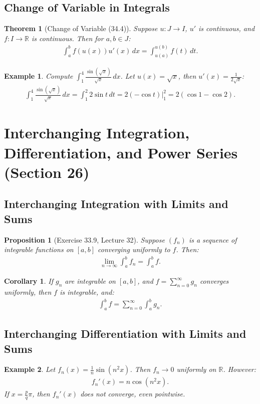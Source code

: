 \documentclass[9pt]{article}
\theoremstyle{definition}
\theoremstyle{plain}
\newtheorem{theorem}{Theorem}
\newtheorem{proposition}{Proposition}
\newtheorem{example}{Example}
\newtheorem{corollary}{Corollary}
\begin{document}
\subsection*{Change of Variable in Integrals}
\begin{theorem}[Change of Variable (34.4)]
Suppose $ u : J \to I $, $ u' $ is continuous, and $ f : I \to \mathbb{R} $ is continuous. Then for $ a, b \in J $:
\begin{align}
\int_a^b f(u(x)) u'(x) \, dx = \int_{u(a)}^{u(b)} f(t) \, dt.
\end{align}
\end{theorem}

\begin{example}
Compute $ \int_1^4 \frac{\sin(\sqrt{x})}{\sqrt{x}} \, dx $. Let $ u(x) = \sqrt{x} $, then $ u'(x) = \frac{1}{2\sqrt{x}} $:
\begin{align}
\int_1^4 \frac{\sin(\sqrt{x})}{\sqrt{x}} \, dx = \int_1^2 2 \sin t \, dt = 2(-\cos t) \big|_1^2 = 2(\cos 1 - \cos 2).
\end{align}
\end{example}
\section*{Interchanging Integration, Differentiation, and Power Series (Section 26)}

\subsection*{Interchanging Integration with Limits and Sums}
\begin{proposition}[Exercise 33.9, Lecture 32]
Suppose $ (f_n) $ is a sequence of integrable functions on $ [a, b] $ converging uniformly to $ f $. Then:
\begin{align}
\lim_{n \to \infty} \int_a^b f_n = \int_a^b f.
\end{align}
\end{proposition}

\begin{corollary}
If $ g_n $ are integrable on $ [a, b] $, and $ f = \sum_{n=0}^\infty g_n $ converges uniformly, then $ f $ is integrable, and:
\begin{align}
\int_a^b f = \sum_{n=0}^\infty \int_a^b g_n.
\end{align}
\end{corollary}

\subsection*{Interchanging Differentiation with Limits and Sums}
\begin{example}
Let $ f_n(x) = \frac{1}{n} \sin(n^2 x) $. Then $ f_n \to 0 $ uniformly on $ \mathbb{R} $. However:
\begin{align}
f_n'(x) = n \cos(n^2 x).
\end{align}
If $ x = \frac{p}{q} \pi $, then $ f_n'(x) $ does not converge, even pointwise.
\end{example}
\end{document}
